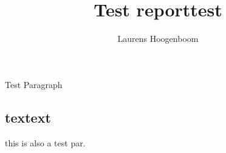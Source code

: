 \documentclass{article}
\author{Laurens Hoogenboom}
\title{Test report}
\begin{document}
\maketitle

\title{test}

\noindent Test Paragraph

\subsection{textext}

this is also a test par.
\end{document}

